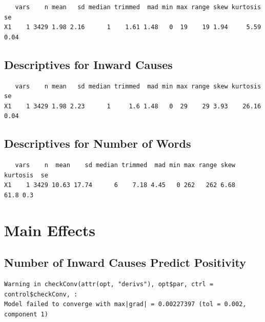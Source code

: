\documentclass[
  .7em,
  letterpaper,
  DIV=11,
  numbers=noendperiod]{scrartcl}
\begin{document}
\begin{verbatim}
   vars    n mean   sd median trimmed  mad min max range skew kurtosis   se
X1    1 3429 1.98 2.16      1    1.61 1.48   0  19    19 1.94     5.59 0.04
\end{verbatim}

\hypertarget{descriptives-for-inward-causes}{%
\subsection{Descriptives for Inward
Causes}\label{descriptives-for-inward-causes}}

\begin{verbatim}
   vars    n mean   sd median trimmed  mad min max range skew kurtosis   se
X1    1 3429 1.98 2.23      1     1.6 1.48   0  29    29 3.93    26.16 0.04
\end{verbatim}

\hypertarget{descriptives-for-number-of-words}{%
\subsection{Descriptives for Number of
Words}\label{descriptives-for-number-of-words}}

\begin{verbatim}
   vars    n  mean    sd median trimmed  mad min max range skew kurtosis  se
X1    1 3429 10.63 17.74      6    7.18 4.45   0 262   262 6.68     61.8 0.3
\end{verbatim}

\hypertarget{main-effects}{%
\section{Main Effects}\label{main-effects}}

\hypertarget{number-of-inward-causes-predict-positivity}{%
\subsection{Number of Inward Causes Predict
Positivity}\label{number-of-inward-causes-predict-positivity}}

\begin{verbatim}
Warning in checkConv(attr(opt, "derivs"), opt$par, ctrl = control$checkConv, :
Model failed to converge with max|grad| = 0.00227397 (tol = 0.002, component 1)
\end{verbatim}
\end{document}
